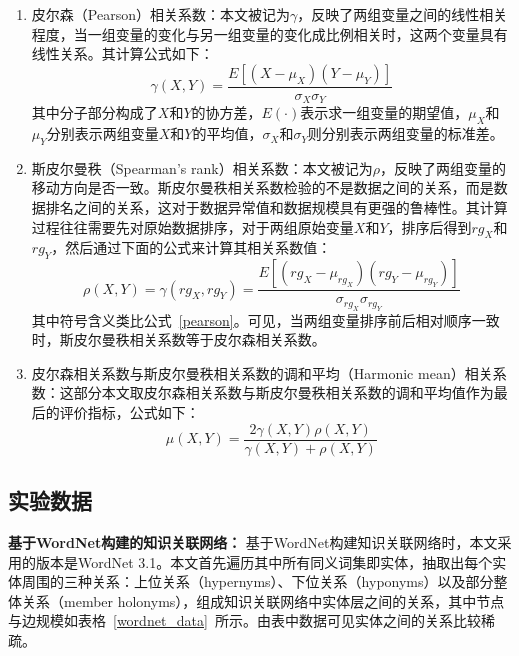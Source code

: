 \begin{enumerate}[（1）]
    \item 皮尔森（Pearson）相关系数：本文被记为$\gamma$，反映了两组变量之间的线性相关程度，当一组变量的变化与另一组变量的变化成比例相关时，这两个变量具有线性关系。其计算公式如下：
    \begin{equation}
        \label{pearson}
        \gamma(X, Y) = \frac{E[(X-\mu_X)(Y-\mu_Y)]}{\sigma_X \sigma_Y}
    \end{equation}
    \noindent 其中分子部分构成了$X$和$Y$的协方差，$E(\cdot)$表示求一组变量的期望值，$\mu_X$和$\mu_Y$分别表示两组变量$X$和$Y$的平均值，$\sigma_X$和$\sigma_Y$则分别表示两组变量的标准差。
    \item 斯皮尔曼秩（Spearman's rank）相关系数：本文被记为$\rho$，反映了两组变量的移动方向是否一致。斯皮尔曼秩相关系数检验的不是数据之间的关系，而是数据排名之间的关系，这对于数据异常值和数据规模具有更强的鲁棒性。其计算过程往往需要先对原始数据排序，对于两组原始变量$X$和$Y$，排序后得到$rg_X$和$rg_Y$，然后通过下面的公式来计算其相关系数值：
    \begin{equation}
        \label{spearman}
        \rho(X, Y) = \gamma(rg_X, rg_Y) =  \frac{E[(rg_X-\mu_{rg_X})(rg_Y-\mu_{rg_Y})]}{\sigma_{rg_X} \sigma_{rg_Y}}
    \end{equation}
    \noindent 其中符号含义类比公式~\ref{pearson}。可见，当两组变量排序前后相对顺序一致时，斯皮尔曼秩相关系数等于皮尔森相关系数。
    \item 皮尔森相关系数与斯皮尔曼秩相关系数的调和平均（Harmonic mean）相关系数：这部分本文取皮尔森相关系数与斯皮尔曼秩相关系数的调和平均值作为最后的评价指标，公式如下：
    \begin{equation}
        \label{harmonic}
        \mu(X, Y) = \frac{2\gamma(X, Y)\rho(X, Y)}{\gamma(X, Y)+\rho(X, Y)}
    \end{equation}
\end{enumerate}

\subsection{实验数据}

\textbf{基于WordNet构建的知识关联网络：}
基于WordNet构建知识关联网络时，本文采用的版本是WordNet 3.1。本文首先遍历其中所有同义词集即实体，抽取出每个实体周围的三种关系：上位关系（hypernyms）、下位关系（hyponyms）以及部分整体关系（member holonyms），组成知识关联网络中实体层之间的关系，其中节点与边规模如表格~\ref{wordnet_data}~所示。由表中数据可见实体之间的关系比较稀疏。

